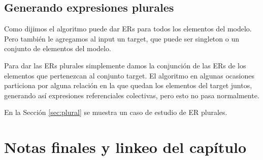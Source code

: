 \subsection{Generando expresiones plurales}
\label{sec:genera_plural}
Como dijimos el algoritmo puede dar ERs para todos los elementos del modelo. Pero tambi\'en le agregamos al input un target, que puede ser singleton o un conjunto de elementos del modelo.

Para dar las ERs plurales simplemente damos la conjunci\'on de las ERs de los elementos que pertenezcan al conjunto target. El algoritmo en algunas ocasiones particiona por alguna relaci\'on en la que quedan los elementos del target juntos, generando as\'i expresiones referenciales colectivas, pero esto no pasa normalmente. 

En la Secci\'on \ref{sec:plural} se muestra un caso de estudio de ER plurales.

\section{Notas finales y linkeo del cap\'itulo}
\label{sec:link-algoritmo}

